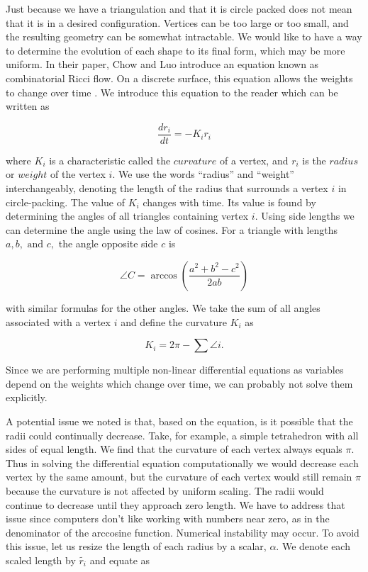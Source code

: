 \documentclass[12pt]{article}
\begin{document}
Just because we have a triangulation and that it is circle packed does not mean that it is in a desired configuration. Vertices can be too large or too small, and the resulting geometry can be somewhat intractable. We would like to have a way to determine the evolution of each shape to its final form, which may be more uniform. In their paper, Chow and Luo introduce an equation known as combinatorial Ricci flow. On a discrete surface, this equation allows the weights to change over time \cite{chowluo}. We introduce this equation to the reader which can be written as

  \begin{equation}
  \label{Riccif}
  \frac{dr_i}{{dt}} = -K_ir_i
  \end{equation}
  
\noindent where $K_i$ is a characteristic called the $curvature$ of a vertex, and $r_i$ is the $radius$ or $weight$ of the vertex $i$. We use the words ``radius'' and ``weight'' interchangeably, denoting the length of the radius that surrounds a vertex $i$ in circle-packing. The value of $K_i$ changes with time. Its value is found by determining the angles of all triangles containing vertex $i$. Using side lengths we can determine the angle using the law of cosines. For a triangle with lengths $a, b,\mbox{ and }c,$ the angle opposite side $c$ is
  
  $$
  \angle C = \arccos(\frac{a^2 + b^2 - c^2}{2ab})
  $$
  
\noindent with similar formulas for the other angles. We take the sum of all angles associated with a vertex $i$ and define the curvature $K_i$ as

\begin{equation}
K_i = 2\pi - \sum{\angle i}.
\end{equation}
  
\noindent Since we are performing multiple non-linear differential equations as variables depend on the weights which change over time, we can probably not solve them explicitly.\newline
   
\noindent A potential issue we noted is that, based on the equation, is it possible that the radii could continually decrease. Take, for example, a simple tetrahedron with all sides of equal length. We find that the curvature of each vertex always equals $\pi$. Thus in solving the differential equation computationally we would decrease each vertex by the same amount, but the curvature of each vertex would still remain $\pi$ because the curvature is not affected by uniform scaling. The radii would continue to decrease until they approach zero length. We have to address that issue since computers don't like working with numbers near zero, as in the denominator of the arccosine function. Numerical instability may occur. To avoid this issue, let us resize the length of each radius by a scalar, $\alpha$. We denote each scaled length by $\tilde{r_i}$ and equate as
 
\end{document}
